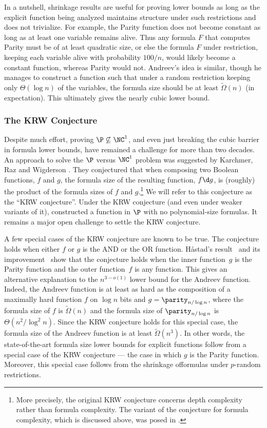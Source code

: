 In a nutshell, shrinkage results are useful %
for  %
proving lower bounds
as long as the explicit function being analyzed maintains structure
under such restrictions and does not trivialize. For example, the
Parity function does not become constant as long as at least one variable
remains alive. Thus any formula $F$ that computes Parity must be
of at least quadratic size, or else the formula $F$ under restriction,
keeping each variable alive with probability $100/n$, would likely
become a constant function, whereas Parity would not. Andreev's idea
is similar, though he manages to construct a function such that under
a random restriction keeping only $\Theta(\log n)$ of the variables,
the formula size should be at least $\tilde{\Omega}(n)$ (in expectation).
This ultimately gives the nearly cubic lower bound.

%
\subsubsection{The KRW Conjecture}  %

Despite much effort, proving $\P\not\subseteq\NC^{1}$, and even just
breaking the \textsf{cubic barrier} in formula lower bounds, have
remained a challenge for more than two decades. An approach to solve
the $\P$ versus $\NC^{1}$ problem was suggested by Karchmer, Raz
and Wigderson \cite{KRW95}. They conjectured that when composing
two Boolean functions, $f$ and $g$, the formula size of the resulting
function, $f\d g$, is (roughly) the product of the formula sizes
of $f$ and $g$.\footnote{More precisely, the original KRW conjecture \cite{KRW95} concerns
depth complexity rather than formula complexity. The variant of the
conjecture for formula complexity, which is discussed above, was posed
in \cite{GMWW17}. } We will refer to this conjecture as the \textsf{``KRW conjecture''}.
Under the KRW conjecture (and even under weaker variants of it), \cite{KRW95}
constructed a function in $\P$ with no polynomial-size formulas.
It remains a major open challenge to settle the KRW conjecture.

A few special cases of the KRW conjecture are known to be true. The
conjecture holds when either $f$ or $g$ is the AND or the OR function.
H{\aa}stad's result~\cite{H98} and its improvement~\cite{T14}
show that the conjecture holds when the inner function~$g$ is the
Parity function and the outer function~$f$ is any function. This
gives an alternative explanation to the $n^{3-o(1)}$ lower bound
for the Andreev function. Indeed, the Andreev function is at least
as hard as the composition of a maximally hard function $f$ on $\log n$
bits and $g=\parity_{n/\log n}$, where the formula size of $f$ is
$\tilde{\Omega}(n)$ and the formula size of $\parity_{n/\log n}$
is $\Theta(n^{2}/\log^{2}n)$. Since the KRW conjecture holds for
this special case, the formula size of the Andreev function is at
least $\tilde{\Omega}(n^{3})$. In other words, the state-of-the-art
formula size lower bounds for explicit functions follow from a special
case of the KRW conjecture --- the case in which $g$ is the Parity
function. Moreover, this special case follows from the shrinkage offormulas under $p$-random restrictions.


